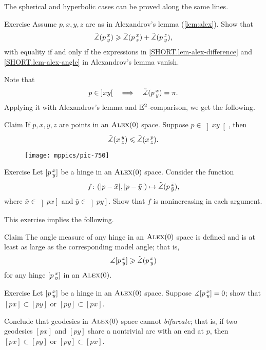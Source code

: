 The spherical and hyperbolic cases can be proved along the same lines.
\qeds

\begin{thm}{Exercise}\label{ex:alex-lemma-cat}
Assume $p,x,y,z$ are as in Alexandrov's lemma (\ref{lem:alex}).
Show that
\[\tilde\measuredangle(p\,{}^{x}_{y})
\geqslant
\tilde\measuredangle(p\,{}^{x}_{z}) + \tilde\measuredangle(p\,{}^{z}_{y}),\]
with equality if and only if the expressions in \ref{SHORT.lem-alex-difference} and \ref{SHORT.lem-alex-angle} in Alexandrov's lemma vanish.
\end{thm}

Note that 
\[p\in\left]x y\right[
\quad\Longrightarrow\quad
\tilde\measuredangle(p\,{}^{x}_{y})=\pi.
\]
Applying it with Alexandrov's lemma and $\mathbb{E}^2$-comparison, we get the following.

\begin{thm}{Claim}\label{clm:angle-mono}
If $p,x,y,z$ are points in an $\textsc{Alex}(0)$ space.
Suppose $p\in\left]x y\right[$, then 
\[\tilde\measuredangle(x\,{}^{y}_{z})\leqslant \tilde\measuredangle(x\,{}^{p}_{z}).\]
\end{thm}

\begin{wrapfigure}{r}{25mm}
\vskip-0mm
\centering
\texttt{[image: mppics/pic-750]}
\end{wrapfigure}

\begin{thm}{Exercise}\label{ex:noncreasing}
Let $[p\,{}^{x}_{y}]$ be a hinge in an $\textsc{Alex}(0)$ space.
Consider the function
\[f\colon(|{p}-{\bar x}|_{}^{{}},|{p}-{\bar y}|_{}^{{}})\mapsto \tilde\measuredangle(p\,{}^{\bar x}_{\bar y}),\]
where $\bar x\in\left]p x\right]$ and $\bar y\in\left]p y\right]$.
Show that $f$ is nonincreasing in each argument.
\end{thm}

This exercise implies the following.

\begin{thm}{Claim}\label{clm:angle-defined}
The angle measure of any hinge in an $\textsc{Alex}(0)$ 
space is defined and  is at least as large as the corresponding model angle;
that is,
\[\measuredangle[p\,{}^{x}_{y}]\geqslant \tilde\measuredangle(p\,{}^{x}_{y})\]
for any hinge $[p\,{}^{x}_{y}]$ in an $\textsc{Alex}(0)$.

\end{thm}

\begin{thm}{Exercise}\label{ex:0-angle}
Let $[p\,{}^{x}_{y}]$ be a hinge in an $\textsc{Alex}(0)$ space.
Suppose $\measuredangle[p\,{}^{x}_{y}]=0$; show that $[px]\subset [py]$ or $[py]\subset [px]$.

Conclude that geodesics in $\textsc{Alex}(0)$ space cannot \emph{bifurcate};
that is, if two geodesics $[px]$ and $[py]$ share a nontrivial arc with an end at $p$, then $[px]\subset [py]$ or $[py]\subset [px]$.
\end{thm}


